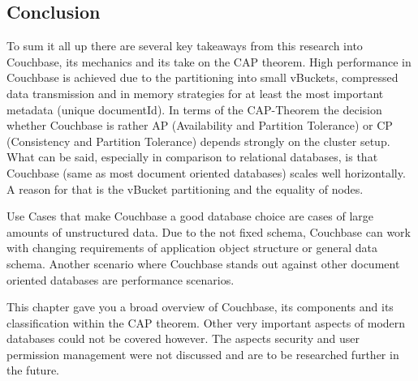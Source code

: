 \subsection{Conclusion}
To sum it all up there are several key takeaways from this research into Couchbase, its mechanics and its take on the CAP theorem. High performance in Couchbase is achieved due to the partitioning into small vBuckets, compressed data transmission and in memory strategies for at least the most important metadata (unique documentId). In terms of the CAP-Theorem the decision whether Couchbase is rather AP (Availability and Partition Tolerance) or CP (Consistency and Partition Tolerance) depends strongly on the cluster setup. What can be said, especially in comparison to relational databases, is that Couchbase (same as most document oriented databases) scales well horizontally. A reason for that is the vBucket partitioning and the equality of nodes.

Use Cases that make Couchbase a good database choice are cases of large amounts of unstructured data. Due to the not fixed schema, Couchbase can work with changing requirements of application object structure or general data schema. Another scenario where Couchbase stands out against other document oriented databases are performance scenarios.

This chapter gave you a broad overview of Couchbase, its components and its classification within the CAP theorem. Other very important aspects of modern databases could not be covered however. The aspects security and user permission management were not discussed and are to be researched further in the future.
